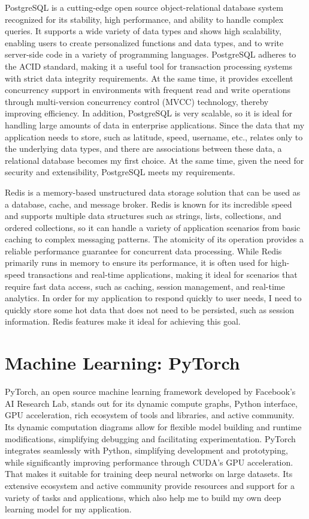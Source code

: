 \documentclass[12pt,two side]{report}
\begin{document}
PostgreSQL is a cutting-edge open source object-relational database system recognized for its stability, high performance, and ability to handle complex queries\cite{postgresql}. It supports a wide variety of data types and shows high scalability, enabling users to create personalized functions and data types, and to write server-side code in a variety of programming languages. PostgreSQL adheres to the ACID standard, making it a useful tool for transaction processing systems with strict data integrity requirements\cite{postgresql}. At the same time, it provides excellent concurrency support in environments with frequent read and write operations through multi-version concurrency control (MVCC) technology, thereby improving efficiency. In addition, PostgreSQL is very scalable, so it is ideal for handling large amounts of data in enterprise applications. Since the data that my application needs to store, such as latitude, speed, username, etc., relates only to the underlying data types, and there are associations between these data, a relational database becomes my first choice. At the same time, given the need for security and extensibility, PostgreSQL meets my requirements.\newline

Redis is a memory-based unstructured data storage solution that can be used as a database, cache, and message broker\cite{redis}. Redis is known for its incredible speed and supports multiple data structures such as strings, lists, collections, and ordered collections, so it can handle a variety of application scenarios from basic caching to complex messaging patterns\cite{redis}. The atomicity of its operation provides a reliable performance guarantee for concurrent data processing. While Redis primarily runs in memory to ensure its performance, it is often used for high-speed transactions and real-time applications, making it ideal for scenarios that require fast data access, such as caching, session management, and real-time analytics. In order for my application to respond quickly to user needs, I need to quickly store some hot data that does not need to be persisted, such as session information. Redis features make it ideal for achieving this goal.

\section{Machine Learning: PyTorch}
PyTorch, an open source machine learning framework developed by Facebook's AI Research Lab, stands out for its dynamic compute graphs, Python interface, GPU acceleration, rich ecosystem of tools and libraries, and active community\cite{pytorch}. Its dynamic computation diagrams allow for flexible model building and runtime modifications, simplifying debugging and facilitating experimentation. PyTorch integrates seamlessly with Python, simplifying development and prototyping, while significantly improving performance through CUDA's GPU acceleration\cite{pytorch}. That makes it suitable for training deep neural networks on large datasets. Its extensive ecosystem and active community provide resources and support for a variety of tasks and applications, which also help me to build my own deep learning model for my application.
\end{document}
